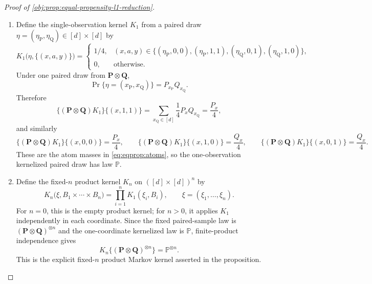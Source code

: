 \begin{proof}[Proof of \cref{obj:prop:equal-propensity-l1-reduction}]
\begin{enumerate}
\item Define the single-observation kernel \(K_1\) from a paired draw
\(\eta=(\eta_{\mathrm P},\eta_{\mathrm Q})\in[d]\times[d]\) by
\[
K_1\bigl(\eta,\{(x,a,y)\}\bigr)
=
\begin{cases}
1/4,& (x,a,y)\in
\{(\eta_{\mathrm P},0,0),(\eta_{\mathrm P},1,1),
  (\eta_{\mathrm Q},0,1),(\eta_{\mathrm Q},1,0)\},\\
0,& \text{otherwise}.
\end{cases}
\]
Under one paired draw from \(\mathbf P\otimes\mathbf Q\),
\[
\Pr\{\eta=(x_{\mathrm P},x_{\mathrm Q})\}=P_{x_{\mathrm P}}Q_{x_{\mathrm Q}}.
\]
Therefore
\[
\{(\mathbf P\otimes\mathbf Q)K_1\}\{(x,1,1)\}
=
\sum_{x_{\mathrm Q}\in[d]}\frac14P_xQ_{x_{\mathrm Q}}
=
\frac{P_x}{4},
\]
and similarly
\[
\{(\mathbf P\otimes\mathbf Q)K_1\}\{(x,0,0)\}=\frac{P_x}{4},
\qquad
\{(\mathbf P\otimes\mathbf Q)K_1\}\{(x,1,0)\}=\frac{Q_x}{4},
\qquad
\{(\mathbf P\otimes\mathbf Q)K_1\}\{(x,0,1)\}=\frac{Q_x}{4}.
\]
These are the atom masses in \cref{eq:eqprop:atoms}, so the one-observation kernelized paired
draw has law \(\mathbb P\). %

\item Define the fixed-\(n\) product kernel \(K_n\) on \(([d]\times[d])^n\) by
\[
K_n\bigl(\xi,B_1\times\cdots\times B_n\bigr)
=
\prod_{i=1}^n K_1(\xi_i,B_i),
\qquad
\xi=(\xi_1,\ldots,\xi_n).
\]
For \(n=0\), this is the empty product kernel; for \(n>0\), it applies \(K_1\) independently in
each coordinate. Since the fixed paired-sample law is \((\mathbf P\otimes\mathbf Q)^{\otimes n}\)
and the one-coordinate kernelized law is \(\mathbb P\), finite-product independence gives
\begin{equation}
\label{eq:eqprop:product-kernel}
K_n\{(\mathbf P\otimes\mathbf Q)^{\otimes n}\}
=
\mathbb P^{\otimes n}.
\end{equation}
This is the explicit fixed-\(n\) product Markov kernel asserted in the proposition. %


\end{enumerate}
\end{proof}
